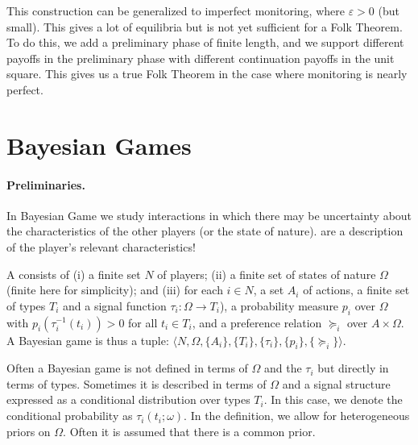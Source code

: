 \documentclass[10pt]{article}
\begin{document}
\begin{remark}
	This construction can be generalized to imperfect monitoring, where $\varepsilon > 0$ (but small). This gives a lot of equilibria but is not yet sufficient for a Folk Theorem. To do this, we add a preliminary phase of finite length, and we support different payoffs in the preliminary phase with different continuation payoffs in the unit square. This gives us a true Folk Theorem in the case where monitoring is nearly perfect.
\end{remark}


\section{Bayesian Games}

\paragraph{Preliminaries.}

\begin{remark}
	In Bayesian Game we study interactions in which there may be uncertainty about the characteristics of the other players (or the state of nature).  are a description of the player's relevant characteristics!
\end{remark}

\begin{definition}
	A  consists of (i) a finite set $N$ of players; (ii) a finite set of states of nature $\Omega$ (finite here for simplicity); and (iii) for each $i \in N$, a set $A_i$ of actions, a finite set of types $T_i$ and a signal function $\tau_i : \Omega \to T_i$), a probability measure $p_i$ over $\Omega$ with $p_i(\tau_i^{-1}(t_i)) > 0$ for all $t_i \in T_i$, and a preference relation $\succeq_i$ over $A \times \Omega$. A Bayesian game is thus a tuple: $\langle N, \Omega, \{A_i\},\{T_i\},\{\tau_i\},\{p_i\},\{\succeq_i\}\rangle$.
\end{definition}

Often a Bayesian game is not defined in terms of $\Omega$ and the  $\tau_i$ but directly in terms of types. Sometimes it is described in terms of $\Omega$ and a signal structure expressed as a conditional distribution over types $T_i$. In this case, we denote the conditional probability as $\tau_i(t_i;\omega)$. In the definition, we allow for heterogeneous priors on $\Omega$. Often it is assumed that there is a common prior.
\end{document}
